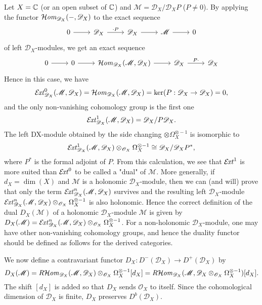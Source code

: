 \begin{example}
Let $X=\mathbb{C}$ (or an open subset of $\mathbb{C}$) and $\mathscr{M}=\mathscr{D}_X/\mathscr{D}_XP$ ($P\neq 0$). By applying the functor $\operatorname{\mathcal{H}\hspace*{-0.4pt}\textit{om}\hspace{0.5pt}}_{\mathscr{D}_X}(-,\mathscr{D}_X)$ to the exact sequence
\[\begin{tikzcd}
0\ar[r]&\mathscr{D}_X\ar[r,"\cdot P"]&\mathscr{D}_X\ar[r]&\mathscr{M}\ar[r]&0
\end{tikzcd}\]
of left $\mathscr{D}_X$-modules, we get an exact sequence
\[\begin{tikzcd}
0\ar[r]&0\ar[r]&\sHom_{\mathscr{D}_X}(\mathscr{M},\mathscr{D}_X)\ar[r]&\mathscr{D}_X\ar[r,"P\cdot"]&\mathscr{D}_X
\end{tikzcd}\]
Hence in this case, we have 
\[\operatorname{\mathcal{E}\hspace*{-1.3pt}\textit{xt}\hspace{0.5pt}}_{\mathscr{D}_X}^0(\mathscr{M},\mathscr{D}_X)=\operatorname{\mathcal{H}\hspace*{-0.4pt}\textit{om}\hspace{0.5pt}}_{\mathscr{D}_X}(\mathscr{M},\mathscr{D}_X)=\operatorname{ker}(P:\mathscr{D}_X\to\mathscr{D}_X)=0,\]
and the only non-vanishing cohomology group is the first one
\[\operatorname{\mathcal{E}\hspace*{-1.3pt}\textit{xt}\hspace{0.5pt}}_{\mathscr{D}_X}^1(\mathscr{M},\mathscr{D}_X)=\mathscr{D}_X/P\mathscr{D}_X.\]
The left DX-module obtained by the side changing $\otimes\Omega_X^{\otimes-1}$ is isomorphic to
\[\operatorname{\mathcal{E}\hspace*{-1.3pt}\textit{xt}\hspace{0.5pt}}_{\mathscr{D}_X}^1(\mathscr{M},\mathscr{D}_X)\otimes_{\mathscr{O}_X}\Omega_X^{\otimes-1}\cong \mathscr{D}_X/\mathscr{D}_XP^*,\]
where $P^*$ is the formal adjoint of $P$. From this calculation, we see that $\operatorname{\mathcal{E}\hspace*{-1.3pt}\textit{xt}\hspace{0.5pt}}^1$ is more suited than $\operatorname{\mathcal{E}\hspace*{-1.3pt}\textit{xt}\hspace{0.5pt}}^0$ to be called a "dual" of $\mathscr{M}$. More generally, if $d_X=\dim(X)$ and $\mathscr{M}$ is a holonomic $\mathscr{D}_X$-module, then we can (and will) prove that only the term $\operatorname{\mathcal{E}\hspace*{-1.3pt}\textit{xt}\hspace{0.5pt}}_{\mathscr{D}_X}^n(\mathscr{M},\mathscr{D}_X)$ survives and the resulting left $\mathscr{D}_X$-module $\operatorname{\mathcal{E}\hspace*{-1.3pt}\textit{xt}\hspace{0.5pt}}_{\mathscr{D}_X}^n(\mathscr{M},\mathscr{D}_X)\otimes_{\mathscr{O}_X}\Omega_X^{\otimes-1}$ is also holonomic. Hence the correct definition of the dual $D_X(\mathscr{M})$ of a holonomic $\mathscr{D}_X$-module $\mathscr{M}$ is given by $D_X(\mathscr{M})=\operatorname{\mathcal{E}\hspace*{-1.3pt}\textit{xt}\hspace{0.5pt}}_{\mathscr{D}_X}^n(\mathscr{M},\mathscr{D}_X)\otimes_{\mathscr{O}_X}\Omega_X^{\otimes-1}$. For a non-holonomic $\mathscr{D}_X$-module, one may have other non-vanishing cohomology groups, and hence the duality functor should be defined as follows for the derived categories.
\end{example}

We now define a contravariant functor $D_X:D^-(\mathscr{D}_X)\to D^+(\mathscr{D}_X)$ by
\[D_X(\mathscr{M})=R\!\operatorname{\mathcal{H}\hspace*{-0.4pt}\textit{om}\hspace{0.5pt}}_{\mathscr{D}_X}(\mathscr{M},\mathscr{D}_X)\otimes_{\mathscr{O}_X}\Omega_X^{\otimes -1}[d_X]=R\!\operatorname{\mathcal{H}\hspace*{-0.4pt}\textit{om}\hspace{0.5pt}}_{\mathscr{D}_X}(\mathscr{M},\mathscr{D}_X\otimes_{\mathscr{O}_X}\Omega_X^{\otimes -1})[d_X].\]
The shift $[d_X]$ is added so that $D_X$ sends $\mathscr{O}_X$ to itself. Since the cohomological dimension of $\mathscr{D}_X$ is finite, $D_X$ preserves $D^b(\mathscr{D}_X)$.

